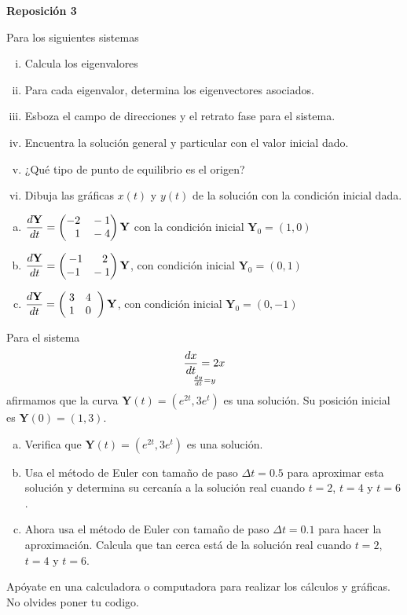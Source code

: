\documentclass[12pt]{exam}
\newcommand*\colvec[3][]{
    \begin{pmatrix}\ifx\relax#1\relax\else#1\\\fi#2\\#3\end{pmatrix}
}
\begin{document}
\centering


\Large 
\textbf{\huge Reposición 3 \\ \large }

\small
\vskip10pt
\normalsize

\pointformat{\bfseries\boldmath(\thepoints)}
\vskip10pt

    
    \begin{questions}
    
     \question%
     Para los siguientes sistemas
     \begin{enumerate}[i.]
         \item Calcula los eigenvalores
         \item Para cada eigenvalor, determina los eigenvectores asociados.
         \item Esboza el campo de direcciones y el retrato fase para el sistema.
         \item Encuentra la solución general y particular con el valor inicial dado.
         \item ¿Qué tipo de punto de equilibrio es el origen?
         \item Dibuja las gráficas $x(t)$ y $y(t)$ de la solución con la condición inicial dada.
     \end{enumerate}
    \vskip 20pt
    
    \begin{enumerate}[a)]
        \item $\dfrac{d\mathbf{Y}}{dt}=\colvec{-2\quad-1}{\phantom{-}1\quad-4}\mathbf{Y}$ con la condición inicial $\mathbf{Y}_0=(1,0)$
        \item $\dfrac{d\mathbf{Y}}{dt}=\colvec{-1\quad\phantom{-}2}{-1\quad-1}\mathbf{Y}$, con condición inicial $\mathbf{Y}_0=(0,1)$
        \item $\dfrac{d\mathbf{Y}}{dt}=\colvec{\;3\quad4\;\;}{\;1\quad0\;\;}\mathbf{Y}$, con condición inicial $\mathbf{Y}_0=(0,-1)$
    \end{enumerate}

    
     \question%
     Para el sistema $$\frac{dx}{dt}=2x\atop \frac{dy}{dt}=y$$
     afirmamos que la curva $\mathbf{Y}(t)=(e^{2t},3e^t)$ es una solución. Su posición inicial es $\mathbf{Y}(0)=(1,3)$.
     \begin{enumerate}[a)]
         \item Verifica que $\mathbf{Y}(t)=(e^{2t},3e^t)$ es una solución.
         \item Usa el método de Euler con tamaño de paso $\Delta t=0.5$ para aproximar esta solución y determina su cercanía a la solución real cuando $t=2$, $t=4$ y $t=6$.
         \item Ahora usa el método de Euler con tamaño de paso $\Delta t=0.1$ para hacer la aproximación. Calcula que tan cerca está de la solución real cuando $t=2$, $t=4$ y $t=6$.
     \end{enumerate}
     Apóyate en una calculadora o computadora para realizar los cálculos y gráficas. No olvides poner tu codigo.


\end{questions}
\end{document}

